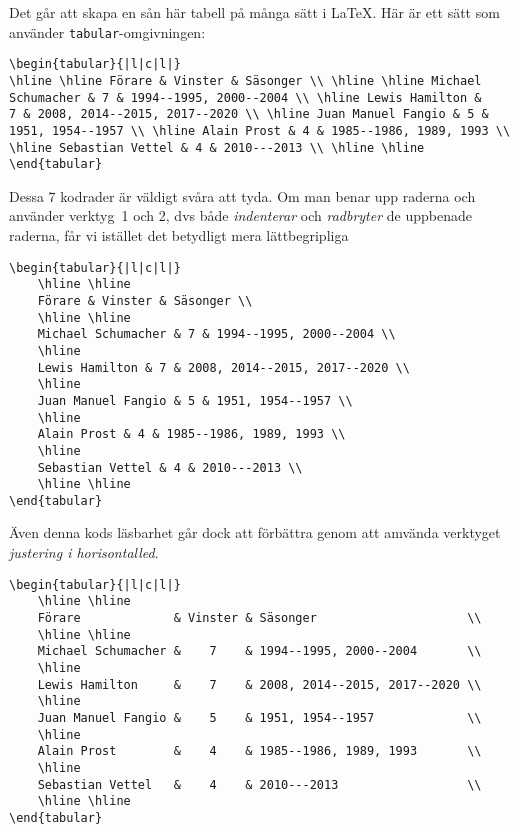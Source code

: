 \documentclass[a4paper,12pt]{article}
\begin{document}
Det går att skapa en sån här tabell på många sätt i \LaTeX. Här är ett
sätt som använder \texttt{tabular}-omgivningen:
%
\begin{verbatim}
\begin{tabular}{|l|c|l|} 
\hline \hline Förare & Vinster & Säsonger \\ \hline \hline Michael
Schumacher & 7 & 1994--1995, 2000--2004 \\ \hline Lewis Hamilton &
7 & 2008, 2014--2015, 2017--2020 \\ \hline Juan Manuel Fangio & 5 &
1951, 1954--1957 \\ \hline Alain Prost & 4 & 1985--1986, 1989, 1993 \\
\hline Sebastian Vettel & 4 & 2010---2013 \\ \hline \hline
\end{tabular}
\end{verbatim}
%
Dessa 7 kodrader är väldigt svåra att tyda. Om man benar upp raderna och
använder verktyg~1 och 2, dvs både \emph{indenterar} och \emph{radbryter}
de uppbenade raderna, får vi istället det betydligt mera lättbegripliga 
%
\begin{verbatim}
\begin{tabular}{|l|c|l|}
    \hline \hline
    Förare & Vinster & Säsonger \\
    \hline \hline      
    Michael Schumacher & 7 & 1994--1995, 2000--2004 \\
    \hline
    Lewis Hamilton & 7 & 2008, 2014--2015, 2017--2020 \\
    \hline
    Juan Manuel Fangio & 5 & 1951, 1954--1957 \\
    \hline
    Alain Prost & 4 & 1985--1986, 1989, 1993 \\
    \hline
    Sebastian Vettel & 4 & 2010---2013 \\ 
    \hline \hline
\end{tabular}
\end{verbatim}
%    
Även denna kods läsbarhet går dock att förbättra genom att amvända
verktyget \emph{justering i horisontalled}.
%
\begin{verbatim}
\begin{tabular}{|l|c|l|}
    \hline \hline
    Förare             & Vinster & Säsonger                     \\
    \hline \hline      
    Michael Schumacher &    7    & 1994--1995, 2000--2004       \\
    \hline
    Lewis Hamilton     &    7    & 2008, 2014--2015, 2017--2020 \\
    \hline
    Juan Manuel Fangio &    5    & 1951, 1954--1957             \\
    \hline
    Alain Prost        &    4    & 1985--1986, 1989, 1993       \\
    \hline
    Sebastian Vettel   &    4    & 2010---2013                  \\ 
    \hline \hline
\end{tabular}
\end{verbatim}    
\end{document}
